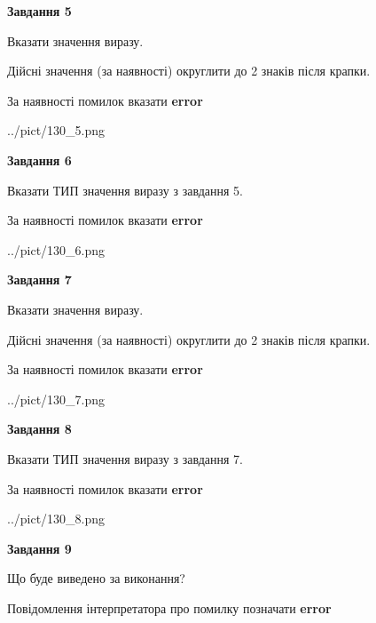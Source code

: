 \documentclass[11pt, ukrainian]{article}
\begin{document}
{\begin {large}
{\begin {center}\textbf{Завдання 5}\end {center}}\par
Вказати значення виразу. \par
Дійсні значення (за наявності) округлити до 2 знаків після крапки. \par
За наявності помилок вказати \textbf{error}

\begin{center}
	{../pict/130_5.png}
\end{center}
\newpage

{\begin {center}\textbf{Завдання 6}\end {center}}\par
Вказати ТИП значення виразу з завдання 5. \par
За наявності помилок вказати \textbf{error}

\begin{center}
	{../pict/130_6.png}
\end{center}
\newpage

{\begin {center}\textbf{Завдання 7}\end {center}}\par
Вказати значення виразу. \par
Дійсні значення (за наявності) округлити до 2 знаків після крапки. \par
За наявності помилок вказати \textbf{error}

\begin{center}
	{../pict/130_7.png}
\end{center}
\newpage

{\begin {center}\textbf{Завдання 8}\end {center}}\par
Вказати ТИП значення виразу з завдання 7. \par
За наявності помилок вказати \textbf{error}

\begin{center}
	{../pict/130_8.png}
\end{center}
\newpage

{\begin {center}\textbf{Завдання 9}\end {center}}\par
Що буде виведено за виконання? \par
Повідомлення інтерпретатора про помилку позначати \textbf{error}


\end{large}}
\end{document}
